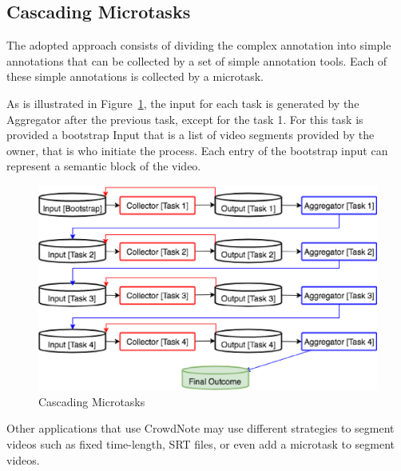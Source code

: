 \subsection{Cascading Microtasks}
The adopted approach consists of dividing the complex annotation into simple annotations that can be collected by a set of simple annotation tools. Each of these simple annotations is collected by a microtask.

As is illustrated in Figure~\ref{cascading}, the input for each task is generated by the Aggregator after the previous task, except for the task 1. For this task is provided a bootstrap Input that is a list of video segments provided by the owner, that is who initiate the process. Each entry of the bootstrap input can represent a semantic block of the video.


\begin{figure}[h!]
 \centerline{\includegraphics[scale=0.35] {figure/Cascading}}
	\caption{Cascading Microtasks}
	\label{cascading}
\end{figure}

Other applications that use CrowdNote may use different strategies to segment videos such as fixed time-length, SRT files, or even add a microtask to segment videos.

		


